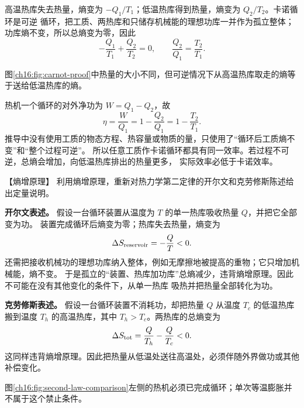 {\begin{xesolution}
高温热库失去热量，熵变为 $-Q_1/T_1$；低温热库得到热量，熵变为 $Q_2/T_2$。卡诺循环是可逆
循环，把工质、两热库和只储存机械能的理想功库一并作为孤立整体；功库熵不变，所以总熵变为零，因此
\[
  -\frac{Q_1}{T_1}+\frac{Q_2}{T_2}=0,
  \qquad
  \frac{Q_2}{Q_1}=\frac{T_2}{T_1}.
\]

\par\noindent\begin{minipage}{\linewidth}
\carnotProofDiagram
{}\label{ch16:fig:carnot-proof}
\end{minipage}\par\medskip
图\ref{ch16:fig:carnot-proof}中热量的大小不同，但可逆情况下从高温热库取走的熵等于送给低温热库的熵。

热机一个循环的对外净功为 $W=Q_1-Q_2$，故
\[
  \boxed{\eta=\frac{W}{Q_1}
  =1-\frac{Q_2}{Q_1}
  =1-\frac{T_2}{T_1}}.
\]
推导中没有使用工质的物态方程、热容量或物质的量，只使用了“循环后工质熵不变”和“整个过程可逆”。
所以任意工质作卡诺循环都具有同一效率。若过程不可逆，总熵会增加，向低温热库排出的热量更多，
实际效率必低于卡诺效率。
\end{xesolution}


\begin{origexamplebox}{【熵增原理】}\label{ch16:ex:s30-21-2}
利用熵增原理，重新对热力学第二定律的开尔文和克劳修斯陈述给出定量说明。

\ThQSecondLaw
\end{origexamplebox}\par\nopagebreak[4]

\par\nopagebreak[4]\begin{xesolution}
\textbf{开尔文表述。} 假设一台循环装置从温度为 $T$ 的单一热库吸收热量 $Q$，并把它全部变为功。
装置完成循环后熵变为零；热库失去热量，熵变为
\[
  \Delta S_{\rm reservoir}=-\frac{Q}{T}<0.
\]
还需把接收机械功的理想功库纳入整体，例如无摩擦地被提高的重物；它只增加机械能，熵不变。
于是孤立的“装置、热库加功库”总熵减少，违背熵增原理。因此不可能在没有其他变化的条件下，从单一热库
吸热并把热量全部转化为功。

\textbf{克劳修斯表述。} 假设一台循环装置不消耗功，却把热量 $Q$ 从温度 $T_c$ 的低温热库搬到温度
$T_h$ 的高温热库，其中 $T_h>T_c$。两热库的总熵变为
\[
  \Delta S_{\rm tot}
  =\frac{Q}{T_h}-\frac{Q}{T_c}<0.
\]
这同样违背熵增原理。因此把热量从低温处送往高温处，必须伴随外界做功或其他补偿变化。

\par\noindent\begin{minipage}{\linewidth}
\secondLawEntropyDiagram
{}\label{ch16:fig:second-law-comparison}
\end{minipage}\par\medskip
图\ref{ch16:fig:second-law-comparison}左侧的热机必须已完成循环；单次等温膨胀并不属于这个禁止条件。


\end{xesolution}}
